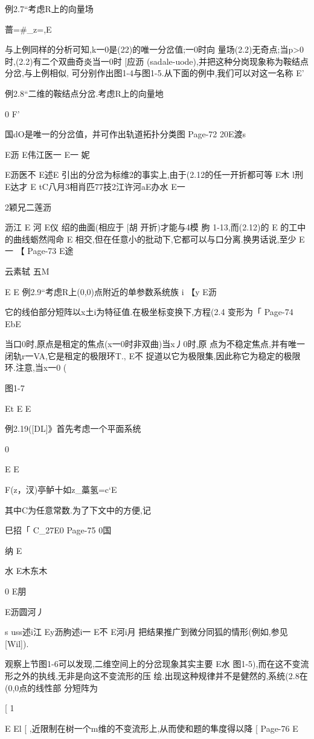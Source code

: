 {例2.7“考虑R上的向量场

蔷=#_z=,E

与上例同样的分析可知,k一0是(22)的唯一分岔值;一0时向
量场(2.2)无奇点;当p>0时,(2.2)有二个双曲奇炎当一0时
[应沥
(sadale-uode),并把这种分岗现象称为鞍结点分岔,与上例相似,
可分别作出图1-4与图1-5.从下面的例中,我们可以对这一名称
E'

例2.8“二维的鞍结点分岔.考虑R上的向量地

{0
F'

国dO是唯一的分岔值，并可作出轨道拓扑分类图
Page-72
20E渡s

E沥
E伟江医一
E一
妮

E沥医不
E述E
引出的分岔为标维2的事实上,由于(2.12的任一开折都可等
E木
l刑
E达才
E
tC八月3相肖匹77技2江许河aE办水
E一

2颖兄二莲沥

沥江
E
河
E仪
绍的曲面(相应于
[胡
开折)才能与4模
朐
1-13,而(2.12)的
E
的工中的曲线蛎然闯命
E
相交,但在任意小的批动下,它都可以与口分离.换男话说,至少
E一
【
Page-73
E途

云素轼
五M

E
E
例2.9“考虑R上(0,0)点附近的单参数系统族
i
【y
E沥

它的线伯部分短阵以x土i为特征值.在极坐标变换下,方程(2.4
变形为「
Page-74
EbE

当口0时,原点是租定的焦点(x一0时非双曲)当x丿0时,原
点为不稳定焦点,并有唯一闭轨r一VA,它是租定的极限环T.,
E不
捉道以它为极限集,因此称它为稳定的极限环.注意,当x一0
(

图1-7

Et
E
E

例2.19([DL]》首先考虑一个平面系统

0

E
E

F(z，汊)亭鲈十如z_藁氢=c`E

其中C为任意常数.为了下文中的方便,记

巳招「
C_27E0
Page-75
0国

纳
E

水
E木东木

0
E朋

E沥圆河丿

s
uss述i江
Ey沥朐述i一
E不
E河i月
把结果推广到微分同狐的情形(例如,参见[Wil]).

观察上节图1-6可以发现,二维空间上的分岔现象其实主要
E水
图1-5),而在这不变流形之外的执线,无非是向这不变流形的压
绘.出现这种规律并不是健然的,系统(2.8在(0,0点的线性部
分短阵为

[
1

E
El
[
,近限制在树一个m维的不变流形上,从而使和题的隼度得以降
[
Page-76
E

}}
